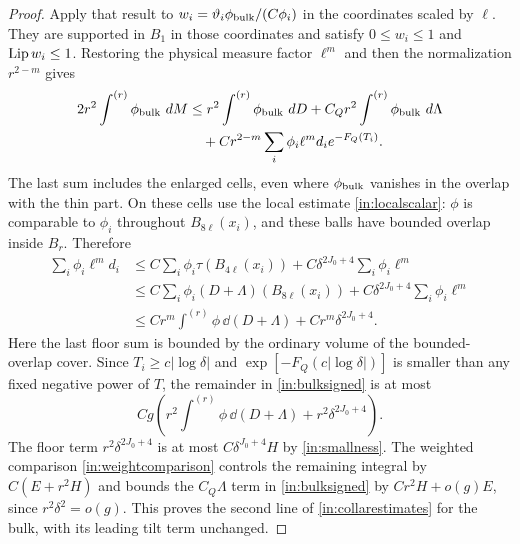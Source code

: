 \begin{proof}
Apply that result to
$w_i=\vartheta_i\phi_{\rm bulk}/(C\phi_i)$ in the coordinates scaled
by $\ell$.  They are supported in $B_1$ in those coordinates and satisfy
$0\leq w_i\leq1$ and $\operatorname{Lip} w_i\leq1$.  Restoring
the physical measure factor $\ell^m$ and then the normalization
$r^{2-m}$ gives
\begin{equation}\label{in:bulksigned}
 \begin{split}
 2r^2\int^{(r)}\phi_{\rm bulk}\,\mathop{}\!d M
 &\leq r^2\int^{(r)}\phi_{\rm bulk}\,\mathop{}\!d D
       +C_Q r^2\int^{(r)}\phi_{\rm bulk}\,\mathop{}\!d\Lambda\\
 &\quad+C r^{2-m}\sum_i\phi_i\ell^m d_i e^{-F_Q(T_i)}.
 \end{split}
\end{equation}
The last sum includes the enlarged cells, even where
$\phi_{\rm bulk}$ vanishes in the overlap with the thin part.
On these cells use the local estimate \eqref{in:localscalar}:
$\phi$ is comparable to $\phi_i$ throughout $B_{8\ell}(x_i)$, and
these balls have bounded overlap inside $B_r$.  Therefore
\[
 \begin{split}
 \sum_i\phi_i\ell^m d_i
 &\leq C\sum_i\phi_i\tau(B_{4\ell}(x_i))
                  +C\delta^{2J_0+4}\sum_i\phi_i\ell^m\\
 &\leq C\sum_i\phi_i(D+\Lambda)(B_{8\ell}(x_i))
                  +C\delta^{2J_0+4}\sum_i\phi_i\ell^m\\
 &\leq Cr^m\int^{(r)}\phi\,\dd(D+\Lambda)
                  +Cr^m\delta^{2J_0+4}.
 \end{split}
\]
Here the last floor sum is bounded by the ordinary volume of the
bounded-overlap cover.  Since $T_i\geq c|\log\delta|$ and
$\exp[-F_Q(c|\log\delta|)]$ is smaller than any fixed negative power
of $T$, the remainder in \eqref{in:bulksigned} is at most
\[
 Cg\left(r^2\int^{(r)}\phi\,\dd(D+\Lambda)
                      +r^2\delta^{2J_0+4}\right).
\]
The floor term $r^2\delta^{2J_0+4}$ is at most
$C\delta^{J_0+4}H$ by \eqref{in:smallness}.  The weighted comparison
\eqref{in:weightcomparison} controls the remaining integral by
$C(E+r^2H)$ and bounds the $C_Q\Lambda$ term in
\eqref{in:bulksigned} by $Cr^2H+o(g)E$, since $r^2\delta^2=o(g)$.
This proves the second line
of \eqref{in:collarestimates} for the bulk, with its leading tilt term
unchanged.


\end{proof}
